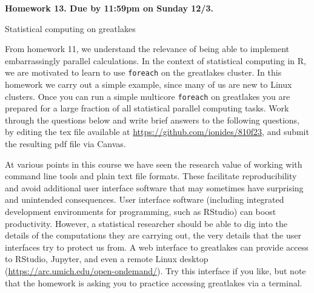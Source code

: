 \documentclass[12pt]{article}
\begin{document}
\begin{center}\bf
Homework 13. Due by 11:59pm on Sunday 12/3.

Statistical computing on greatlakes

\end{center}

From homework 11, we understand the relevance of being able to implement embarrassingly parallel calculations. In the context of statistical computing in R, we are motivated to learn to use \texttt{foreach} on the greatlakes cluster. In this homework we carry out a simple example, since many of us are new to Linux clusters. Once you can run a simple multicore \texttt{foreach} on greatlakes you are prepared for a large fraction of all statistical parallel computing tasks. Work through the questions below and write brief answers to the following questions, by editing the tex file available at \url{https://github.com/ionides/810f23}, and submit the resulting pdf file via Canvas. 

At various points in this course we have seen the research value of working with command line tools and plain text file formats. These facilitate reproducibility and avoid additional user interface software that may sometimes have surprising and unintended consequences. User interface software (including integrated development environments for programming, such as RStudio) can boost productivity. However, a statistical researcher should be able to dig into the details of the computations they are carrying out, the very details that the user interfaces try to protect us from. A web interface to greatlakes can provide access to RStudio, Jupyter, and even a remote Linux desktop (\url{https://arc.umich.edu/open-ondemand/}). Try this interface if you like, but note that the homework is asking you to practice accessing greatlakes via a terminal.
\end{document}
